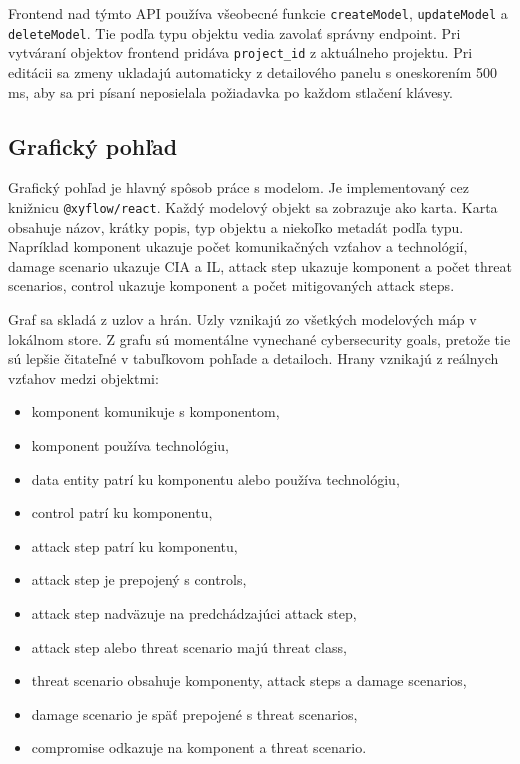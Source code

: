 \documentclass[11pt]{article}
\begin{document}
Frontend nad týmto API používa všeobecné funkcie \texttt{createModel}, \texttt{updateModel} a \texttt{deleteModel}. Tie podľa typu objektu vedia zavolať správny endpoint. Pri vytváraní objektov frontend pridáva \texttt{project\_id} z aktuálneho projektu. Pri editácii sa zmeny ukladajú automaticky z detailového panelu s oneskorením 500 ms, aby sa pri písaní neposielala požiadavka po každom stlačení klávesy.

\subsection{Grafický pohľad}

Grafický pohľad je hlavný spôsob práce s modelom. Je implementovaný cez knižnicu \texttt{@xyflow/react}. Každý modelový objekt sa zobrazuje ako karta. Karta obsahuje názov, krátky popis, typ objektu a niekoľko metadát podľa typu. Napríklad komponent ukazuje počet komunikačných vzťahov a technológií, damage scenario ukazuje CIA a IL, attack step ukazuje komponent a počet threat scenarios, control ukazuje komponent a počet mitigovaných attack steps.

Graf sa skladá z uzlov a hrán. Uzly vznikajú zo všetkých modelových máp v lokálnom store. Z grafu sú momentálne vynechané cybersecurity goals, pretože tie sú lepšie čitateľné v tabuľkovom pohľade a detailoch. Hrany vznikajú z reálnych vzťahov medzi objektmi:

\begin{itemize}
    \item komponent komunikuje s komponentom,
    \item komponent používa technológiu,
    \item data entity patrí ku komponentu alebo používa technológiu,
    \item control patrí ku komponentu,
    \item attack step patrí ku komponentu,
    \item attack step je prepojený s controls,
    \item attack step nadväzuje na predchádzajúci attack step,
    \item attack step alebo threat scenario majú threat class,
    \item threat scenario obsahuje komponenty, attack steps a damage scenarios,
    \item damage scenario je späť prepojené s threat scenarios,
    \item compromise odkazuje na komponent a threat scenario.
\end{itemize}
\end{document}
